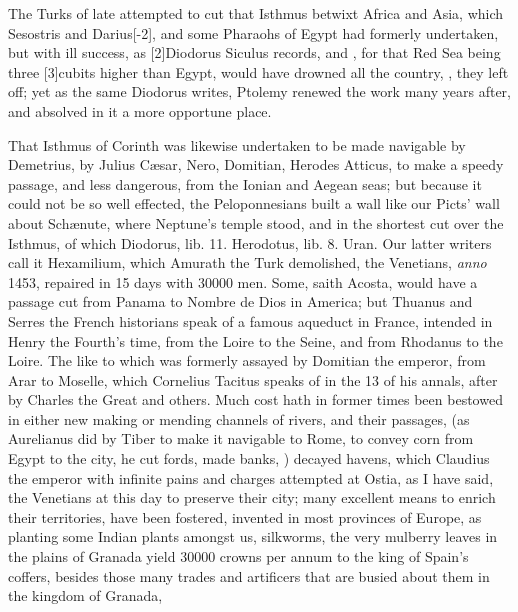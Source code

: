 The Turks of late attempted to cut that Isthmus betwixt Africa and
Asia, which Sesostris and Darius[-2\baselineskip], and some Pharaohs of Egypt had
formerly undertaken, but with ill success, as [2\baselineskip]Diodorus Siculus
records, and \Pliny{}, for that Red Sea being three [3\baselineskip]cubits higher
than Egypt, would have drowned all the country, ,
they left off; yet as the same Diodorus writes, Ptolemy renewed
the work many years after, and absolved in it a more opportune place.

That Isthmus of Corinth was likewise undertaken to be made navigable by
Demetrius, by Julius C\ae{}sar, Nero, Domitian, Herodes Atticus, to make a
speedy passage, and less dangerous, from the Ionian and Aegean
seas; but because it could not be so well effected, the Peloponnesians
built a wall like our Picts' wall about Sch\ae{}nute, where Neptune's
temple stood, and in the shortest cut over the Isthmus, of which
Diodorus, lib. 11. Herodotus, lib. 8. Uran. Our latter writers call it
Hexamilium, which Amurath the Turk demolished, the Venetians, \emph{anno}
1453, repaired in 15 days with 30\thinspace{}000 men. Some, saith Acosta, would
have a passage cut from Panama to Nombre de Dios in America; but
Thuanus and Serres the French historians speak of a famous aqueduct in
France, intended in Henry the Fourth's time, from the Loire to the
Seine, and from Rhodanus to the Loire. The like to which was formerly
assayed by Domitian the emperor, from Arar to Moselle, which
Cornelius Tacitus speaks of in the 13 of his annals, after by Charles
the Great and others. Much cost hath in former times been bestowed in
either new making or mending channels of rivers, and their passages,
(as Aurelianus did by Tiber to make it navigable to Rome, to convey
corn from Egypt to the city,  he cut fords, made banks, \etc{})
decayed havens, which Claudius the emperor with infinite pains and
charges attempted at Ostia, as I have said, the Venetians at this day
to preserve their city; many excellent means to enrich their
territories, have been fostered, invented in most provinces of Europe,
as planting some Indian plants amongst us, silkworms, the very
mulberry leaves in the plains of Granada yield 30\thinspace{}000 crowns per annum
to the king of Spain's coffers, besides those many trades and
artificers that are busied about them in the kingdom of Granada,
